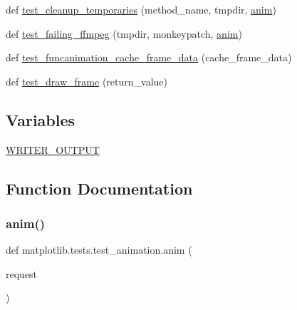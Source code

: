 \begin{DoxyCompactItemize}
\item 
def \hyperlink{namespacematplotlib_1_1tests_1_1test__animation_a51709496402d9994bd2eb393f657ff60}{test\+\_\+cleanup\+\_\+temporaries} (method\+\_\+name, tmpdir, \hyperlink{namespacematplotlib_1_1tests_1_1test__animation_a51b21831a9d76c555ea5ec7148ebe9be}{anim})
\item 
def \hyperlink{namespacematplotlib_1_1tests_1_1test__animation_a91d69c14178facffb198377a34b5e8f0}{test\+\_\+failing\+\_\+ffmpeg} (tmpdir, monkeypatch, \hyperlink{namespacematplotlib_1_1tests_1_1test__animation_a51b21831a9d76c555ea5ec7148ebe9be}{anim})
\item 
def \hyperlink{namespacematplotlib_1_1tests_1_1test__animation_af0ec4d563ed536f25ec1b15343c8a3c4}{test\+\_\+funcanimation\+\_\+cache\+\_\+frame\+\_\+data} (cache\+\_\+frame\+\_\+data)
\item 
def \hyperlink{namespacematplotlib_1_1tests_1_1test__animation_afcdb7dbbf785a0b2cdf76b297693a50c}{test\+\_\+draw\+\_\+frame} (return\+\_\+value)
\end{DoxyCompactItemize}
\subsection*{Variables}
\begin{DoxyCompactItemize}
\item 
\hyperlink{namespacematplotlib_1_1tests_1_1test__animation_a0bf447ab85e04884bfb9caabbc1c30f7}{W\+R\+I\+T\+E\+R\+\_\+\+O\+U\+T\+P\+UT}
\end{DoxyCompactItemize}


\subsection{Function Documentation}
\mbox{\label{namespacematplotlib_1_1tests_1_1test__animation_a51b21831a9d76c555ea5ec7148ebe9be}} 
\subsubsection{\texorpdfstring{anim()}{anim()}}
{\footnotesize\ttfamily def matplotlib.\+tests.\+test\+\_\+animation.\+anim (\begin{DoxyParamCaption}\item[{}]{request }\end{DoxyParamCaption})}

